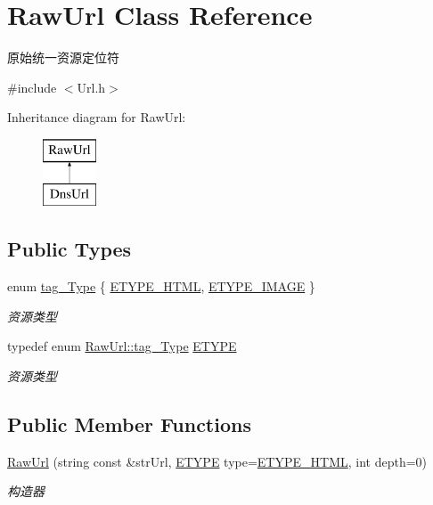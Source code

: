 \hypertarget{class_raw_url}{}\section{Raw\+Url Class Reference}
\label{class_raw_url}


原始统一资源定位符  




{\ttfamily \#include $<$Url.\+h$>$}

Inheritance diagram for Raw\+Url\+:\begin{figure}[H]
\begin{center}
\leavevmode
\includegraphics[height=2.000000cm]{class_raw_url}
\end{center}
\end{figure}
\subsection*{Public Types}
\begin{DoxyCompactItemize}
\item 
enum \hyperlink{class_raw_url_a193b4d2277a698b58643d1565cac278a}{tag\+\_\+\+Type} \{ \hyperlink{class_raw_url_a193b4d2277a698b58643d1565cac278aa6959b742b81c5a298a8a587f2ce5b955}{E\+T\+Y\+P\+E\+\_\+\+H\+T\+ML}, 
\hyperlink{class_raw_url_a193b4d2277a698b58643d1565cac278aa86232672f7dc4b0635d0716032a82390}{E\+T\+Y\+P\+E\+\_\+\+I\+M\+A\+GE}
 \}\begin{DoxyCompactList}\small\item\em 资源类型 \end{DoxyCompactList}
\item 
\mbox{\label{class_raw_url_a6d7469b7f73d43e86e68d8c4182a7a51}} 
typedef enum \hyperlink{class_raw_url_a193b4d2277a698b58643d1565cac278a}{Raw\+Url\+::tag\+\_\+\+Type} \hyperlink{class_raw_url_a6d7469b7f73d43e86e68d8c4182a7a51}{E\+T\+Y\+PE}
\begin{DoxyCompactList}\small\item\em 资源类型 \end{DoxyCompactList}\end{DoxyCompactItemize}
\subsection*{Public Member Functions}
\begin{DoxyCompactItemize}
\item 
\hyperlink{class_raw_url_a2f295fd2c4e3614531e38968c633433f}{Raw\+Url} (string const \&str\+Url, \hyperlink{class_raw_url_a6d7469b7f73d43e86e68d8c4182a7a51}{E\+T\+Y\+PE} type=\hyperlink{class_raw_url_a193b4d2277a698b58643d1565cac278aa6959b742b81c5a298a8a587f2ce5b955}{E\+T\+Y\+P\+E\+\_\+\+H\+T\+ML}, int depth=0)
\begin{DoxyCompactList}\small\item\em 构造器 \end{DoxyCompactList}\end{DoxyCompactItemize}
